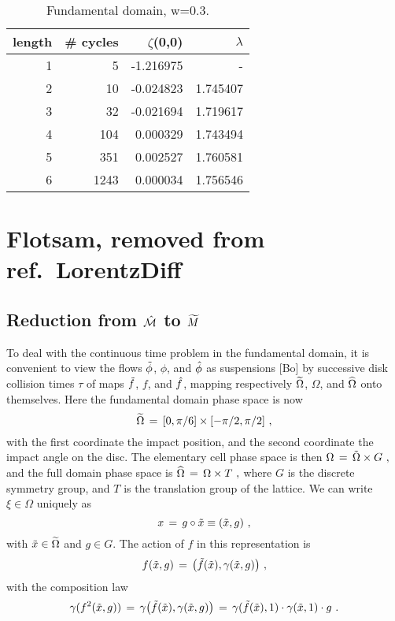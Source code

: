 \begin{table}
\begin{center}
\begin{tabular}{|r|r|r|r|}
\hline
length & \# cycles & $\zeta$(0,0) & $\lambda$ \\ \hline\hline
1      &    5     &  -1.216975 &     -    \\
2      &   10     &  -0.024823 & 1.745407 \\
3      &   32     &  -0.021694 & 1.719617 \\
4      &  104     &   0.000329 & 1.743494 \\
5      &  351     &   0.002527 & 1.760581 \\
6      & 1243     &   0.000034 & 1.756546 \\ \hline
\end{tabular}
\end{center}
\caption{\label{TS:CONV}
Fundamental domain, w=0.3.
    }
\end{table}


\renewcommand{\thesection}{}
\section{Flotsam, removed from ref.~{LorentzDiff}}


\subsection{Reduction from $\hat {{\cal M}}$ to ${\widetilde M}$}


To deal with the continuous time problem in the fundamental domain, it is
convenient to view the flows $\tilde \phi$, $\phi$, and $\hat \phi$
as suspensions [Bo] by successive disk collision times $\tau$
of maps $\tilde f$, $f$, and $\hat f$,
mapping respectively $\widetilde\Omega$, $\Omega$, and $\widehat\Omega$ onto themselves. Here
the fundamental domain phase space is now
$$
\widetilde\Omega  \,=\,   [0,\pi/6] \times [-\pi/2,\pi/2]~,
$$
with the first coordinate the impact position, and the second
coordinate the impact angle on the disc.
The elementary cell phase space is then
$
\Omega \,=\,  \tilde \Omega \times G~,
$
and the full domain phase space is
$
\widehat\Omega \,=\,   \Omega \times T~,
$
where $G$ is the discrete symmetry group, and $T$ is the translation group of
the lattice.
We can write $\xi\in \Omega$ uniquely as
$$
x \,=\,  g\circ \tilde{x} \equiv (\tilde{x},g)~,
$$
with $\tilde{x}\in\widetilde\Omega$ and $g\in G$.
The action of $f$ in this representation is
$$
f(\tilde{x},g) \,=\,  \bigl (\tilde f(\tilde{x}), \gamma(\tilde{x},g)\bigr )~,
$$
with the composition law
$$
\gamma(f^2(\tilde{x},g)) \,=\,  \gamma\bigl (\tilde f(\tilde{x}),\gamma(\tilde{x},g)\bigr ) \,=\,
\gamma(\tilde f(\tilde{x}),1)\cdot \gamma(\tilde{x},1)\cdot g~.
$$

